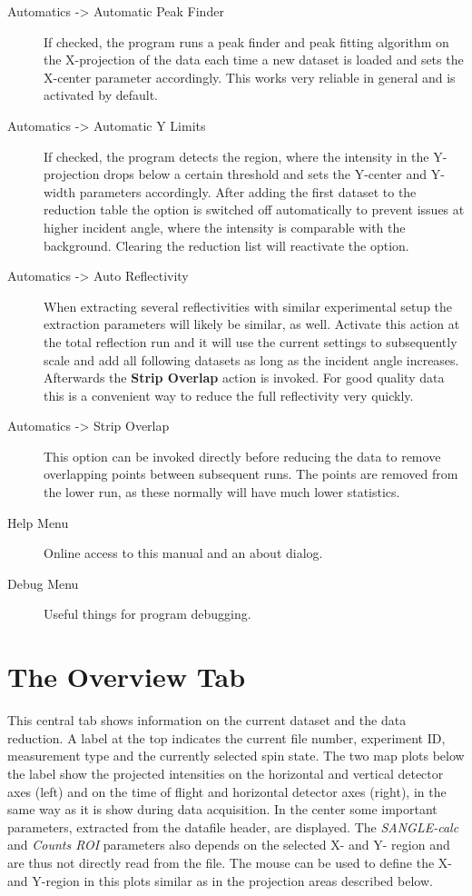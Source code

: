 \begin{description}
   \item[{ Automatics -> Automatic Peak Finder}] If checked, the program runs a peak finder and peak fitting algorithm on the X-projection of the data each time a new dataset is loaded and sets the X-center parameter accordingly. This works very reliable in general and is activated by default.
   \item[{ Automatics -> Automatic Y Limits}] If checked, the program detects the region, where the intensity in the Y-projection drops below a certain threshold and sets the Y-center and Y-width parameters accordingly. After adding the first dataset to the reduction table the option is switched off automatically to prevent issues at higher incident angle, where the intensity is comparable with the background. Clearing the reduction list will reactivate the option.
   \item[{ Automatics -> Auto Reflectivity}] When extracting several reflectivities with similar experimental setup the extraction parameters will likely be similar, as well. Activate this action at the total reflection run and it will use the current settings to subsequently scale and add all following datasets as long as the incident angle increases. Afterwards the \textbf{Strip Overlap} action is invoked. For good quality data this is a convenient way to reduce the full reflectivity very quickly.
   \item[{ Automatics -> Strip Overlap}] This option can be invoked directly before reducing the data to remove overlapping points between subsequent runs. The points are removed from the lower \Qz run, as these normally will have much lower statistics.
   
   \item[Help Menu] Online access to this manual and an about dialog.
   
   \item[Debug Menu] Useful things for program debugging.
   \end{description}

\section{The Overview Tab}
  This central tab shows information on the current dataset and the data reduction. A label at the top indicates the current file number, experiment ID, measurement type and the currently selected spin state.
  The two map plots below the label show the projected intensities on the horizontal and vertical detector axes (left) and on the time of flight and horizontal detector axes (right), in the same way as it is show during data acquisition.
  In the center some important parameters, extracted from the datafile header, are displayed. The \textit{SANGLE-calc} and \textit{Counts ROI} parameters also depends on the selected X- and Y- region and are thus not directly read from the file.
  The mouse can be used to define the X- and Y-region in this plots similar as in the projection areas described below.
  
